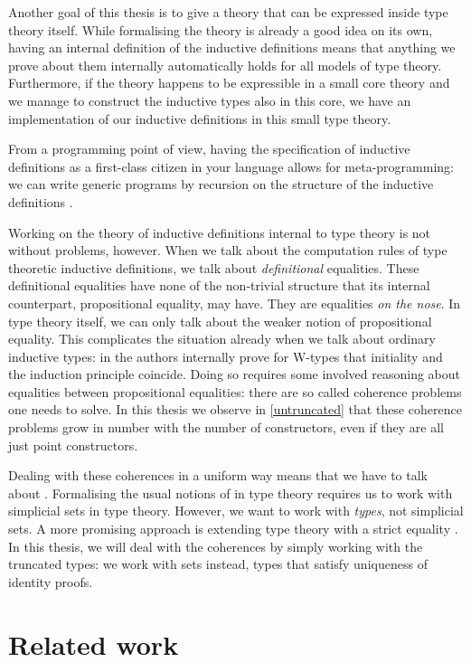 Another goal of this thesis is to give a theory that can be expressed
inside type theory itself. While formalising the theory is already a
good idea on its own, having an internal definition of the inductive
definitions means that anything we prove about them internally
automatically holds for all models of type theory. Furthermore, if the
theory happens to be expressible in a small core theory and we manage
to construct the inductive types also in this core, we have an
implementation of our inductive definitions in this small type theory.

From a programming point of view, having the specification of
inductive definitions as a first-class citizen in your language allows
for meta-programming: we can write generic programs by recursion on
the structure of the inductive definitions \cite{Benke2003}.

Working on the theory of inductive definitions internal to type theory
is not without problems, however. When we talk about the computation
rules of type theoretic inductive definitions, we talk about
\emph{definitional} equalities. These definitional equalities have
none of the non-trivial structure that its internal counterpart,
propositional equality, may have. They are equalities \emph{on the
  nose}. In type theory itself, we can only talk about the weaker
notion of propositional equality. This complicates the situation
already when we talk about ordinary inductive types: in
\cite{Awodey2012} the authors internally prove for W-types that
initiality and the induction principle coincide. Doing so requires
some involved reasoning about equalities between propositional
equalities: there are so called coherence problems one needs to
solve. In this thesis we observe in \cref{untruncated} that these
coherence problems grow in number with the number of constructors,
even if they are all just point constructors.

Dealing with these coherences in a uniform way means that we have to
talk about \inftycats \cite{Camarena2013}. Formalising the usual
notions of \inftycat in type theory requires us to work with
simplicial sets in type theory. However, we want to work with
\emph{types}, not simplicial sets. A more promising approach is
extending type theory with a strict equality
\cite{Altenkirch2016ii,Altenkirch2016iii}. In this thesis, we will
deal with the coherences by simply working with the truncated types:
we work with sets instead, \ie types that satisfy uniqueness of
identity proofs.

\section{Related work}

